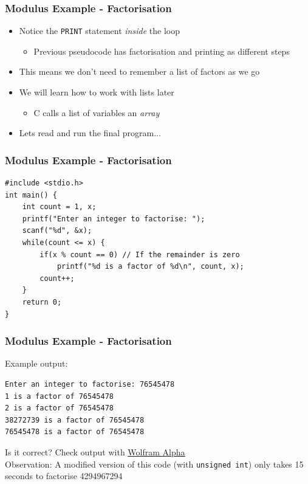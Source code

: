 \documentclass[14pt]{beamer}
\begin{document}
\begin{frame}
\frametitle{Modulus Example - Factorisation}
\begin{itemize}
\item Notice the \texttt{PRINT} statement \textit{inside} the loop
	\begin{itemize}
		\item Previous pseudocode has factorisation and printing as different steps
	\end{itemize}
\item This means we don't need to remember a list of factors as we go
\item We will learn how to work with lists later
	\begin{itemize}
		\item C calls a list of variables an \textit{array}
	\end{itemize}
\item Lets read and run the final program...
\end{itemize}
\end{frame}

\begin{frame}[fragile]
\frametitle{Modulus Example - Factorisation}
\begin{lstlisting}[style=CStyle,basicstyle=\ttfamily\footnotesize,caption=\texttt{factors.c}]
#include <stdio.h>
int main() {
	int count = 1, x;
	printf("Enter an integer to factorise: ");
	scanf("%d", &x);
	while(count <= x) {
		if(x % count == 0) // If the remainder is zero
			printf("%d is a factor of %d\n", count, x);
		count++;
	}
	return 0;
}
\end{lstlisting}
\end{frame}

\begin{frame}[fragile]
\frametitle{Modulus Example - Factorisation}
Example output:
\begin{lstlisting}[style=pseudo]
Enter an integer to factorise: 76545478
1 is a factor of 76545478
2 is a factor of 76545478
38272739 is a factor of 76545478
76545478 is a factor of 76545478
\end{lstlisting}

Is it correct? Check output with \underline{\href{https://www.wolframalpha.com/input/?i=factors+of+76545478}{Wolfram Alpha}}
\\
\vspace{5mm}
Observation: A modified version of this code (with \texttt{unsigned int}) only takes 15 seconds to factorise 4294967294
\end{frame}
\end{document}
